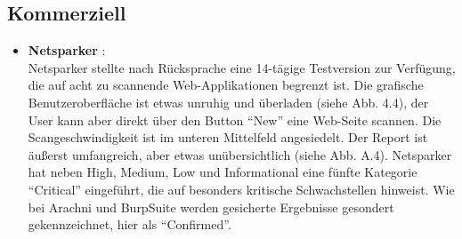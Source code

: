 \documentclass[12pt,oneside,a4paper,parskip,pointlessnumbers]{scrbook}
\begin{document}
    \subsection{Kommerziell}
      \begin{itemize}
        \item \textbf{Netsparker} \cite{Netsparker}:\\
          Netsparker stellte nach Rücksprache eine 14-tägige Testversion zur Verfügung, die auf acht zu scannende Web-Applikationen begrenzt ist. Die grafische Benutzeroberfläche ist etwas unruhig und überladen (siehe Abb. 4.4), der User kann aber direkt über den Button ``New'' eine Web-Seite scannen. Die Scangeschwindigkeit ist im unteren Mittelfeld angesiedelt. Der Report ist äußerst umfangreich, aber etwas unübersichtlich (siehe Abb. A.4). Netsparker hat neben High, Medium, Low und Informational eine fünfte Kategorie ``Critical'' eingeführt, die auf besonders kritische Schwachstellen hinweist. Wie bei Arachni und BurpSuite werden gesicherte Ergebnisse gesondert gekennzeichnet, hier als ``Confirmed''.


\end{itemize}
\end{document}
